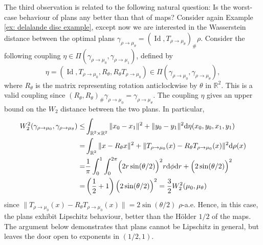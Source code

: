 \documentclass[11pt, oneside, titlepage]{book}
\theoremstyle{plain}
\theoremstyle{definition}
\newcommand{\R}{\mathbb{R}}
\newcommand{\di}{\mathrm{d}}
\DeclareMathOperator{\id}{Id}
\begin{document}
The third observation is related to the following natural question: Is the worst-case behaviour of plans any better than that of maps? Consider again Example \ref{ex: delalande disc example}, except now we are interested in the Wasserstein distance between the optimal plans $\gamma_{\rho \to \mu_{\theta}} = (\id, T_{\rho \to \mu_\theta})_{\#}\rho$. Consider the following coupling $\eta \in \Pi(\gamma_{\rho \to \mu_0}, \gamma_{\rho \to \mu_1})$, defined by 
\begin{equation*}
    \eta = (\id, T_{\rho \to \mu_0}, R_\theta, R_\theta T_{\rho \to \mu_0}) \in \Pi(\gamma_{\rho\to \mu_0}, \gamma_{\rho\to \mu_\theta}),
\end{equation*}
where $R_\theta$ is the matrix representing rotation anticlockwise by $\theta$ in $\R^2$. This is a valid coupling since $(R_{\theta}, R_\theta)_\#\gamma_{\rho\to \mu_0} = \gamma_{\rho\to \mu_\theta}$. The coupling $\eta$ gives an upper bound on the $W_2$ distance between the two plans. In particular,
\begin{align*}
    W_2^2(\gamma_{\rho \to \mu_{0}}, \gamma_{\rho \to \mu_{\theta}}) \leq& \int_{\R^{2} \times \R^{2}} \|x_0-x_1\|^2 + \|y_0 - y_1\|^2 \di \eta(x_0, y_0, x_1, y_1)\\
    =&
    \int_{\R^{2}} \| x- R_\theta x\|^2 + \| T_{\rho \to \mu_0}(x) - R_\theta T_{\rho \to\mu_0}(x)\|^2 \di \rho(x)\\
    =& \frac{1}{\pi}\int_0^1 \int_{0}^{2\pi} \Bigl( 2r\sin(\theta/2)\Bigr)^2 r \di \phi \di r + \Bigl(2\sin(\theta/2)\Bigr)^2\\
    =& \left(\frac{1}{2} + 1\right)\Bigl( 2\sin(\theta/2)\Bigr)^2 = \frac{3}{2}W_2^2(\mu_0,\mu_\theta)
\end{align*}
since $\| T_{\rho \to \mu_0}(x) - R_\theta T_{\rho \to\mu_0}(x)\| = 2\sin(\theta/2)$ $\rho$-a.e.
Hence, in this case, the plans exhibit Lipschitz behaviour, better than the Hölder $1/2$ of the maps. The argument below demonstrates that plans cannot be Lipschitz in general, but leaves the door open to exponents in $(1/2, 1)$.
\end{document}
